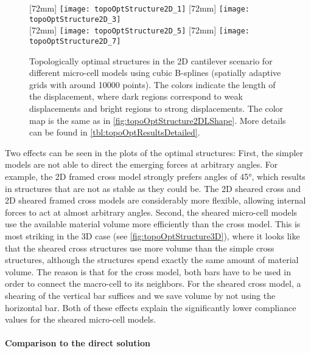 \begin{figure}
  [72mm]{%
    \texttt{[image: topoOptStructure2D\_1]}%
  }%
  \hfill%
  [72mm]{%
    \texttt{[image: topoOptStructure2D\_3]}%
  }%
  \\[2mm]%
  [72mm]{%
    \texttt{[image: topoOptStructure2D\_5]}%
  }%
  \hfill%
  [72mm]{%
    \texttt{[image: topoOptStructure2D\_7]}%
  }%
  \caption[Optimal structures in the 2D cantilever scenario]{%
    Topologically optimal structures in the 2D cantilever scenario
    for different micro-cell models using cubic B-splines
    (spatially adaptive grids with around \num{10000} points).
    The colors indicate the length of the displacement,
    where dark regions correspond to weak displacements and
    bright regions to strong displacements.
    The color map is the same as in
    \cref{fig:topoOptStructure2DLShape}.
    More details can be found in \cref{tbl:topoOptResultsDetailed}.%
  }%
  \label{fig:topoOptStructure2DCantilever}%
\end{figure}

\pagebreak

Two effects can be seen in the plots of the optimal structures:
First, the simpler models are not able to direct the emerging forces at
arbitrary angles.
For example, the 2D framed cross model strongly prefers
angles of \ang{45}, which results in structures that are not as stable
as they could be.
The 2D sheared cross and 2D sheared framed cross models
are considerably more flexible, allowing
internal forces to act at almost arbitrary angles.
Second, the sheared micro-cell models use the available
material volume more efficiently than the cross model.
This is most striking in the 3D case (see \cref{fig:topoOptStructure3D}),
where it looks like that the sheared cross structures
use more volume than the simple cross structures,
although the structures spend exactly the same amount of material volume.
The reason is that for the cross model, both bars
have to be used in order to connect the macro-cell to its neighbors.
For the sheared cross model, a shearing of the vertical bar suffices
and we save volume by not using the horizontal bar.
Both of these effects explain the significantly lower compliance
values for the sheared micro-cell models.

\paragraph{Comparison to the direct solution}

